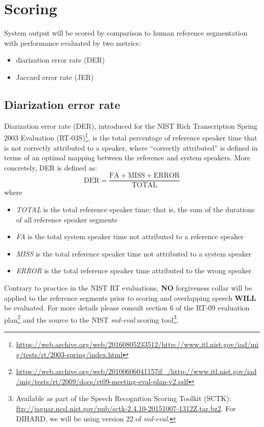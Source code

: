 \documentclass{article}
\begin{document}
\section{Scoring}
System output will be scored by comparison to human reference segmentation with performance evaluated by two metrics:
    \begin{itemize}
        \item diarization error rate (DER)
        \item Jaccard error rate (JER) 
    \end{itemize}

\subsection{Diarization error rate}
Diarization error rate (DER), introduced for the NIST Rich Transcription Spring 2003 Evaluation (RT-03S)\footnote{\url{https://web.archive.org/web/20160805233512/http://www.itl.nist.gov/iad/mig/tests/rt/2003-spring/index.html}}, is the total percentage of reference speaker time that is not correctly attributed to a speaker, where ``correctly attributed'' is defined in terms of an optimal mapping between the reference and system speakers. More concretely, DER is defined as: 
%
\begin{equation*}
    \textrm{DER} = \frac{\textrm{FA} + \textrm{MISS} + \textrm{ERROR}}{\textrm{TOTAL}}
\end{equation*}
%
where
%
\begin{itemize}
    \item {\it TOTAL} is the total reference speaker time; that is, the sum of the durations of all reference speaker segments
    \item {\it FA} is the total system speaker time not attributed to a reference speaker
    \item {\it MISS} is the total reference speaker time not attributed to a system speaker
    \item {\it ERROR} is the total reference speaker time attributed to the wrong speaker
\end{itemize}
%
Contrary to practice in the NIST RT evaluations, {\bf NO} forgiveness collar will be applied to the reference segments prior to scoring and overlapping speech {\bf WILL} be evaluated. For more details please consult section 6 of the RT-09 evaluation plan\footnote{\url{https://web.archive.org/web/20100606041157if_/http://www.itl.nist.gov/iad/mig/tests/rt/2009/docs/rt09-meeting-eval-plan-v2.pdf}} and the source to the NIST {\it md-eval} scoring tool\footnote{Available as part of the Speech Recognition Scoring Toolkit (SCTK): \url{ftp://jaguar.ncsl.nist.gov/pub/sctk-2.4.10-20151007-1312Z.tar.bz2}. For DIHARD, we will be using version 22 of {\it md-eval}.}.
\end{document}
